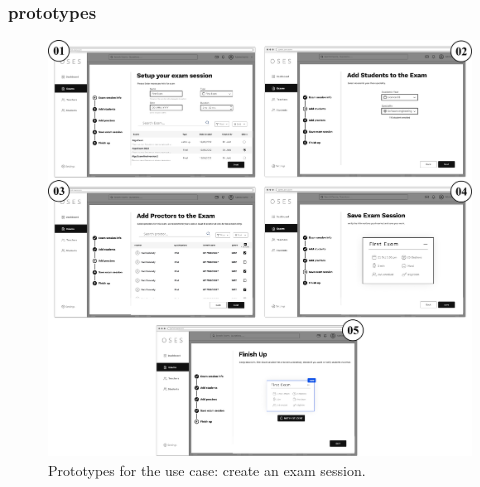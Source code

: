 \documentclass[]{uc2pfecaneva}
\begin{document}
\subsubsection{prototypes}
\begin{figure}[h]
	
	\centering
	\includegraphics[width=\textwidth]{images/prototypes_create_exam_session}
	
	\caption{Prototypes for the use case: create an exam session.}
\end{figure}
\clearpage
\end{document}
